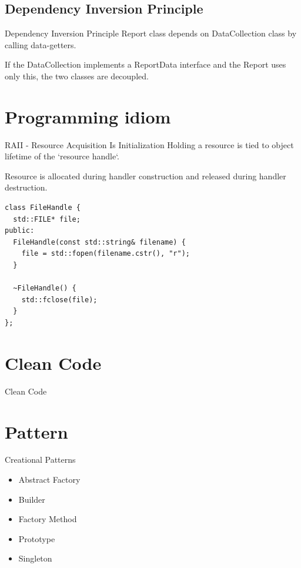 \documentclass{beamer}
\begin{document}
\subsection{Dependency Inversion Principle}

\begin{frame}{Dependency Inversion Principle}
Report class depends on DataCollection class by calling data-getters.

If the DataCollection implements a ReportData interface and the Report uses only
this, the two classes are decoupled.
\end{frame}

\section{Programming idiom}
\begin{frame}[fragile]{RAII - Resource Acquisition Is Initialization}
Holding a resource is tied to object lifetime of the `resource handle`.
\par
Resource is allocated during handler construction and released during handler
destruction.

\begin{lstlisting}
class FileHandle {
  std::FILE* file;
public:
  FileHandle(const std::string& filename) {
    file = std::fopen(filename.cstr(), "r");
  }
  
  ~FileHandle() {
    std::fclose(file);
  }
};
\end{lstlisting}
\end{frame}



\section{Clean Code}
\begin{frame}{Clean Code}
\end{frame}

\section{Pattern}

\begin{frame}{Creational Patterns}
\begin{itemize}
  \item Abstract Factory
  \item Builder
  \item Factory Method
  \item Prototype
  \item Singleton
\end{itemize}
\end{frame}
\end{document}
